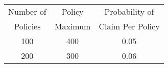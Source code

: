 \documentclass[12pt,letterpaper]{article}
\begin{document}
\begin{center}
	\begin{tabular}{c c c} \hline
		Number of & Policy & Probability of\\
		Policies &  Maximum &  Claim Per Policy\\ \hline
		100 & 400 & 0.05\\
		200 & 300 & 0.06\\ \hline
	\end{tabular}
\end{center}
\end{document}
